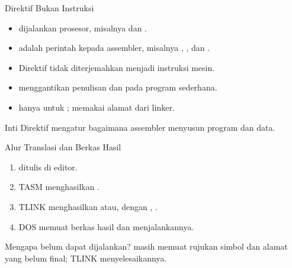 \documentclass[aspectratio=169,11pt]{beamer}
\begin{document}
\begin{frame}{Direktif Bukan Instruksi}
\small
\begin{itemize}
    \item {} dijalankan prosesor, misalnya
           dan .

    \vspace{0.18em}
    \item {} adalah perintah kepada assembler,
          misalnya , , dan .

    \vspace{0.18em}
    \item Direktif tidak diterjemahkan menjadi instruksi mesin.

    \vspace{0.18em}
    \item {} menggantikan penulisan  dan
           pada program sederhana.

    \vspace{0.18em}
    \item {} hanya untuk ; 
          memakai alamat dari linker.
\end{itemize}

\vspace{0.25em}
\begin{block}{Inti}
\small Direktif mengatur bagaimana assembler menyusun program dan
data.
\end{block}
\end{frame}

\begin{frame}{Alur Translasi dan Berkas Hasil}
\small
\begin{enumerate}
    \item {} ditulis di editor.

    \vspace{0.15em}
    \item TASM menghasilkan .

    \vspace{0.15em}
    \item TLINK menghasilkan  atau, dengan
          , .

    \vspace{0.15em}
    \item DOS memuat berkas hasil dan menjalankannya.
\end{enumerate}

\vspace{0.25em}
\begin{block}{Mengapa  belum dapat dijalankan?}
\small {} masih memuat rujukan simbol dan alamat yang belum
final; TLINK menyelesaikannya.
\end{block}
\end{frame}
\end{document}
